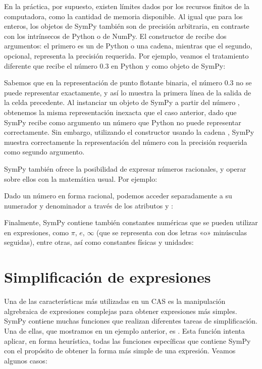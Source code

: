 
En la práctica, por supuesto, existen límites dados por los recursos finitos de la computadora, como la cantidad de memoria disponible. Al igual que para los enteros, los objetos  de SymPy también son de precisión arbitraria, en contraste con los  intrínsecos de Python o de NumPy. El constructor de  recibe dos argumentos: el primero es un  de Python o una cadena, mientras que el segundo, opcional, representa la precisión requerida. Por ejemplo, veamos el tratamiento diferente que recibe el número $0.3$ en Python y como objeto de SymPy:


Sabemos que en la representación de punto flotante binaria, el número $0.3$ no se puede representar exactamente, y así lo muestra la primera línea de la salida de la celda precedente. Al instanciar un objeto  de SymPy a partir del número , obtenemos la misma representación inexacta que el caso anterior, dado que SymPy recibe como argumento un número que Python no puede representar correctamente. Sin embargo, utilizando el constructor usando la cadena , SymPy muestra correctamente la representación del número con la precisión requerida como segundo argumento.

SymPy también ofrece la posibilidad de expresar números racionales, y operar sobre ellos con la matemática usual. Por ejemplo:


Dado un número en forma racional, podemos acceder separadamente a su numerador y denominador a través de los atributos  y :


Finalmente, SymPy contiene también constantes numéricas que se pueden utilizar en expresiones, como $\pi$, $e$, $\infty$ (que se representa con dos letras «o» minúsculas seguidas), entre otras, así como constantes físicas y unidades:


\section{Simplificación de expresiones}
Una de las características más utilizadas en un CAS es la manipulación algrebraica de expresiones complejas para obtener expresiones más simples. SymPy contiene muchas funciones que realizan diferentes tareas de simplificación. Una de ellas, que mostramos en un ejemplo anterior, es . Esta función intenta aplicar, en forma heurística, todas las funciones específicas que contiene SymPy con el propósito de obtener la forma más simple de una expresión. Veamos algunos casos: 

